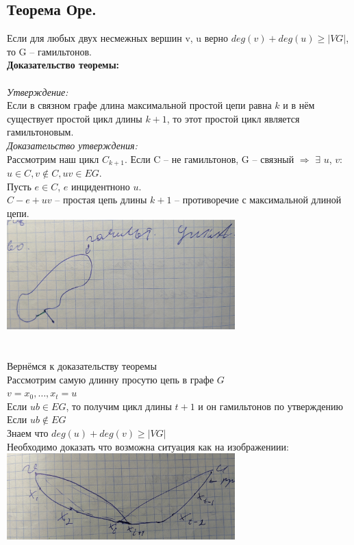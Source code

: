 \documentclass[12pt]{article}
\begin{document}
\subsection{Теорема Оре.}
	Если для любых двух несмежных вершин v, u верно $deg(v) + deg(u) \geqslant |VG|$, то G – гамильтонов.\\
	\textbf{Доказательство теоремы:}\\\\
		\textit{Утверждение:}\\
		Если в связном графе длина максимальной простой цепи равна $k$ и в нём существует простой цикл длины $k + 1$, то этот простой цикл является гамильтоновым.\\
	\textit{Доказательство утверждения:}\\
		Рассмотрим наш цикл $C_{k+1}$. Если C – не гамильтонов, G – связный $\Rightarrow$ $\exists$ $u$, $v$: $u \in C, v \notin C, uv \in EG$.\\ Пусть $e \in C$, $e$ инцидентноно $u$.\\
		$C - e + uv$ – простая цепь длины $k + 1$ – противоречие с максимальной длиной цепи.\\
		\includegraphics[width=250pt]{2}\\
	\qedsymbol\\\\
		Вернёмся к доказательству теоремы\\
		Рассмотрим самую длинну просутю цепь в графе $G$\\
		$v = x_0,\dotsc,x_t = u$\\
		Если $ub \in EG$, то получим цикл длины $t+1$ и он гамильтонов по утверждению\\
		Если $ub \notin EG$\\
		Знаем что $deg(u) + deg(v) \geqslant |VG|$\\
		Необходимо доказать что возможна ситуация как на изображениии:\\
		\includegraphics[width=250pt]{3}\\
\end{document}
